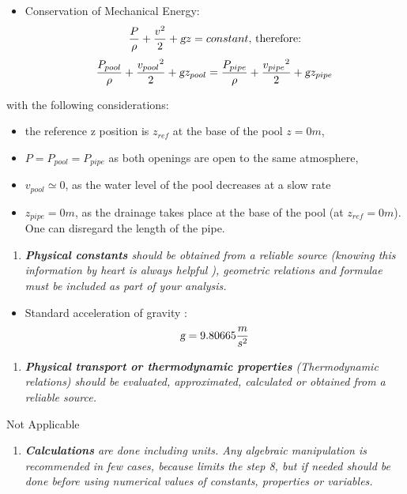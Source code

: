 \documentclass{article}
\begin{document}
\begin{itemize}
\item Conservation of Mechanical Energy:
$$ \frac{P}{\rho} + \frac{v^2}{2} + \textsl{g} z = constant \textrm{, therefore:}$$
$$ \frac{P_{pool}}{\rho} + \frac{{v_{pool}}^2}{2} + \textsl{g} z_{pool} = \frac{P_{pipe}}{\rho} + \frac{{v_{pipe}}^2}{2} + \textsl{g} z_{pipe} $$
\end{itemize}

with the following considerations:
\begin{itemize}
\item the reference z position is $z_{ref}$ at the base of the pool $z = 0m$,
\item $P = P_{pool} = P_{pipe}$ as both openings are open to the same atmosphere,
\item $v_{pool} \simeq 0$, as the water level of the pool decreases at a slow rate
\item $z_{pipe} = 0m$, as the drainage takes place at the base of the pool (at $z_{ref} = 0m$). One can disregard the length of the pipe.
\end{itemize}

\begin{enumerate}[resume]
\item \textit{\textbf{Physical constants} should be obtained from a reliable source (knowing this information by heart is always helpful ), geometric relations and formulae must be included as part of your analysis.}
\end{enumerate}

\begin{itemize}
\item Standard acceleration of gravity \cite{Cengel2017}:
$$ \textsl{g} = 9.80665 \frac{m}{s^2} $$
\end{itemize}

\begin{enumerate}[resume]
\item \textit{\textbf{Physical transport or thermodynamic properties} (Thermodynamic relations) should be evaluated, approximated, calculated or obtained from a reliable source.}
\end{enumerate}

Not Applicable

\begin{enumerate}[resume]
\item \textit{\textbf{Calculations} are done including units. Any algebraic manipulation is recommended in few cases, because limits the step 8, but if needed should be done before using numerical values of constants, properties or variables.}
\end{enumerate}
\end{document}
